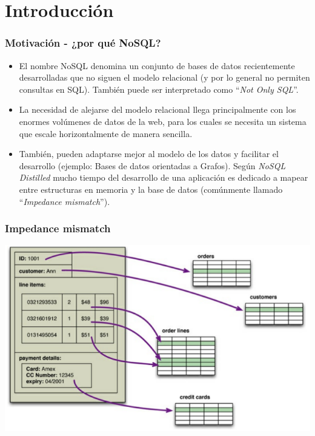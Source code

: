 \section{Introducción}

\begin{frame}
\frametitle{Motivación - ¿por qué NoSQL?}
\begin{itemize}

\item	El nombre NoSQL denomina un conjunto de bases
	de datos recientemente desarrolladas que no siguen el modelo
	relacional (y por lo general no permiten consultas en SQL).
	También puede ser interpretado como ``\textit{Not Only SQL}''.
	\pause

\item	La necesidad de alejarse del modelo relacional llega
	principalmente con los enormes volúmenes de datos de la web,
	para los cuales se necesita un sistema que escale horizontalmente de manera sencilla.
	\pause

\item	También, pueden adaptarse mejor al modelo de los datos y facilitar
	el desarrollo (ejemplo: Bases de datos orientadas a Grafos). Según \textit{NoSQL Distilled} mucho
	tiempo del desarrollo de una aplicación es dedicado a mapear entre
	estructuras en memoria y la base de datos (comúnmente llamado
	``\textit{Impedance mismatch}'').
\end{itemize}
\end{frame}

\begin{frame}
\frametitle{Impedance mismatch}
\includegraphics[width=\linewidth,height=\textheight,keepaspectratio]{impedance}
\end{frame}

